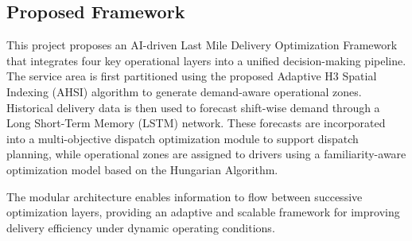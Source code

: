 \documentclass{article}
\begin{document}
\subsection{Proposed Framework}
\label{subsec:proposed_framework}

This project proposes an AI-driven Last Mile Delivery Optimization Framework that integrates four key operational layers into a unified decision-making pipeline. The service area is first partitioned using the proposed Adaptive H3 Spatial Indexing (AHSI) algorithm to generate demand-aware operational zones. Historical delivery data is then used to forecast shift-wise demand through a Long Short-Term Memory (LSTM) network. These forecasts are incorporated into a multi-objective dispatch optimization module to support dispatch planning, while operational zones are assigned to drivers using a familiarity-aware optimization model based on the Hungarian Algorithm.

The modular architecture enables information to flow between successive optimization layers, providing an adaptive and scalable framework for improving delivery efficiency under dynamic operating conditions.
\end{document}

